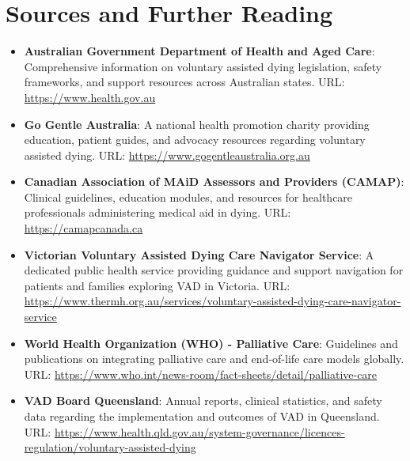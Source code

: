 \section*{Sources and Further Reading}
\begin{itemize}
    \item \textbf{Australian Government Department of Health and Aged Care}: Comprehensive information on voluntary assisted dying legislation, safety frameworks, and support resources across Australian states. URL: \url{https://www.health.gov.au}
    \item \textbf{Go Gentle Australia}: A national health promotion charity providing education, patient guides, and advocacy resources regarding voluntary assisted dying. URL: \url{https://www.gogentleaustralia.org.au}
    \item \textbf{Canadian Association of MAiD Assessors and Providers (CAMAP)}: Clinical guidelines, education modules, and resources for healthcare professionals administering medical aid in dying. URL: \url{https://camapcanada.ca}
    \item \textbf{Victorian Voluntary Assisted Dying Care Navigator Service}: A dedicated public health service providing guidance and support navigation for patients and families exploring VAD in Victoria. URL: \url{https://www.thermh.org.au/services/voluntary-assisted-dying-care-navigator-service}
    \item \textbf{World Health Organization (WHO) - Palliative Care}: Guidelines and publications on integrating palliative care and end-of-life care models globally. URL: \url{https://www.who.int/news-room/fact-sheets/detail/palliative-care}
    \item \textbf{VAD Board Queensland}: Annual reports, clinical statistics, and safety data regarding the implementation and outcomes of VAD in Queensland. URL: \url{https://www.health.qld.gov.au/system-governance/licences-regulation/voluntary-assisted-dying}
\end{itemize}
